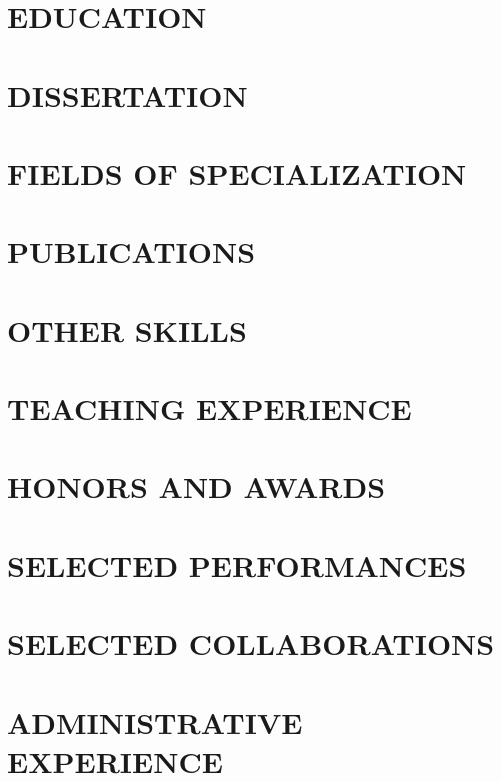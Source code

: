 \documentclass[overlapped]{res}
\begin{document}
\begin{resume}

\section{EDUCATION}


\section{DISSERTATION}



\section{FIELDS OF SPECIALIZATION}


\section{PUBLICATIONS}


\section{OTHER SKILLS}


\section{TEACHING EXPERIENCE}


\section{HONORS AND AWARDS}


\section{SELECTED PERFORMANCES}


\section{SELECTED COLLABORATIONS}


\section{ADMINISTRATIVE EXPERIENCE}


\end{resume}
\end{document}
